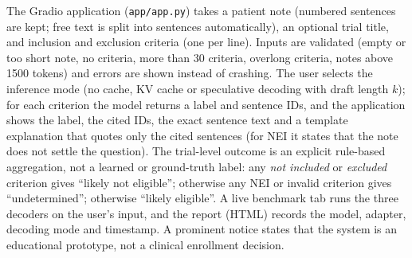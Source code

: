 The Gradio application (\texttt{app/app.py}) takes a patient note (numbered sentences are kept; free text is split into sentences automatically), an optional trial title, and inclusion and exclusion criteria (one per line). Inputs are validated (empty or too short note, no criteria, more than 30 criteria, overlong criteria, notes above 1500 tokens) and errors are shown instead of crashing. The user selects the inference mode (no cache, KV cache or speculative decoding with draft length $k$); for each criterion the model returns a label and sentence IDs, and the application shows the label, the cited IDs, the exact sentence text and a template explanation that quotes only the cited sentences (for NEI it states that the note does not settle the question). The trial-level outcome is an explicit rule-based aggregation, not a learned or ground-truth label: any \emph{not included} or \emph{excluded} criterion gives ``likely not eligible''; otherwise any NEI or invalid criterion gives ``undetermined''; otherwise ``likely eligible''. A live benchmark tab runs the three decoders on the user's input, and the report (HTML) records the model, adapter, decoding mode and timestamp. A prominent notice states that the system is an educational prototype, not a clinical enrollment decision.
